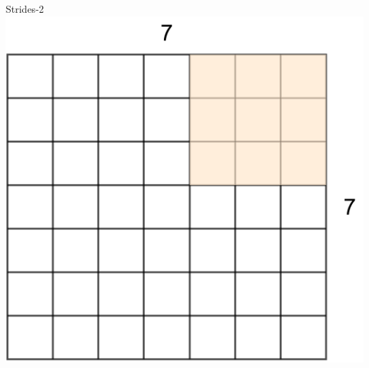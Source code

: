 \documentclass[default, aspectratio=169]{beamer}
\begin{document}
\begin{frame}{Strides-2}
		\hspace{0.2cm}
		\includegraphics[keepaspectratio, scale=0.2]{pic/Stride8.png}
		
	\end{frame}
\end{document}
